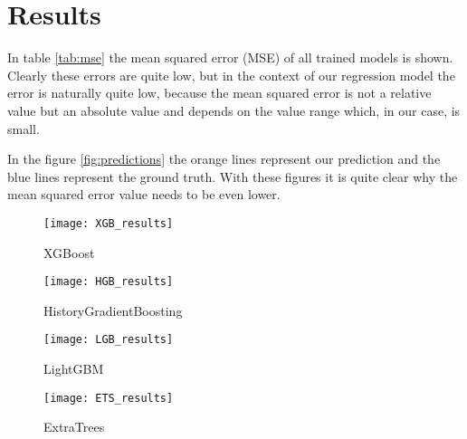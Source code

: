 \section{Results}
In table \ref{tab:mse} the mean squared error (MSE) of all trained models is shown. Clearly these errors are quite low, but in the context of our regression model the error is naturally quite low, because the mean squared error is not a relative value but an absolute value and depends on the value range which, in our case, is small. 

\begin{table}[h]
	\caption{Mean squared error of trained models}
	\label{tab:mse}
\end{table}

In the figure \ref{fig:predictions} the orange lines represent our prediction and the blue lines represent the ground truth. With these figures it is quite clear why the mean squared error value needs to be even lower.

\begin{figure*}[bt]
	\begin{subfigure}{.24\textwidth}
		\centering
		\texttt{[image: XGB\_results]}
		\caption{XGBoost}
	\end{subfigure}
	\begin{subfigure}{.24\textwidth}
		\centering
		\texttt{[image: HGB\_results]}
		\caption{HistoryGradientBoosting}
	\end{subfigure}
	\begin{subfigure}{.24\textwidth}
		\centering
		\texttt{[image: LGB\_results]}
		\caption{LightGBM}
	\end{subfigure}
	\begin{subfigure}{.24\textwidth}
		\centering
		\texttt{[image: ETS\_results]}
		\caption{ExtraTrees}
	\end{subfigure}
	\caption{Comparison of concatenated predictions (orange) to ground truth (blue).}
	\label{fig:predictions}
\end{figure*}

